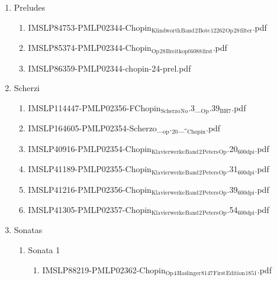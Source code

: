 \documentclass[11pt]{article}
\begin{document}
\begin{enumerate}
\item Preludes
\label{sec-1-1-1-1-44-21-6}
\begin{enumerate}
\item IMSLP84753-PMLP02344-Chopin$_{\text{Klindworth}}$$_{\text{Band}}$$_{\text{2}}$$_{\text{Bote}}$$_{\text{12262}}$$_{\text{Op}}$$_{\text{28}}$$_{\text{filter}}$.pdf
\label{sec-1-1-1-1-44-21-6-1}

\item IMSLP85374-PMLP02344-Chopin$_{\text{Op}}$$_{\text{28}}$$_{\text{Breitkopf}}$$_{\text{6088}}$$_{\text{first}}$.pdf
\label{sec-1-1-1-1-44-21-6-2}

\item IMSLP86359-PMLP02344-chopin-24-prel.pdf
\label{sec-1-1-1-1-44-21-6-3}
\end{enumerate}

\item Scherzi
\label{sec-1-1-1-1-44-21-7}
\begin{enumerate}
\item IMSLP114447-PMLP02356-FChopin$_{\text{Scherzo}}$$_{\text{No}}$.3\_$_{\text{Op}}$.39$_{\text{BH7}}$.pdf
\label{sec-1-1-1-1-44-21-7-1}

\item IMSLP164605-PMLP02354-Scherzo\_$_{\text{op}}$.$_{\text{20}}$\_-$_{\text{Chopin}}$.pdf
\label{sec-1-1-1-1-44-21-7-2}

\item IMSLP40916-PMLP02354-Chopin$_{\text{Klavierwerke}}$$_{\text{Band}}$$_{\text{2}}$$_{\text{Peters}}$$_{\text{Op}}$.20$_{\text{600dpi}}$.pdf
\label{sec-1-1-1-1-44-21-7-3}

\item IMSLP41189-PMLP02355-Chopin$_{\text{Klavierwerke}}$$_{\text{Band}}$$_{\text{2}}$$_{\text{Peters}}$$_{\text{Op}}$.31$_{\text{600dpi}}$.pdf
\label{sec-1-1-1-1-44-21-7-4}

\item IMSLP41216-PMLP02356-Chopin$_{\text{Klavierwerke}}$$_{\text{Band}}$$_{\text{2}}$$_{\text{Peters}}$$_{\text{Op}}$.39$_{\text{600dpi}}$.pdf
\label{sec-1-1-1-1-44-21-7-5}

\item IMSLP41305-PMLP02357-Chopin$_{\text{Klavierwerke}}$$_{\text{Band}}$$_{\text{2}}$$_{\text{Peters}}$$_{\text{Op}}$.54$_{\text{600dpi}}$.pdf
\label{sec-1-1-1-1-44-21-7-6}
\end{enumerate}

\item Sonatas
\label{sec-1-1-1-1-44-21-8}
\begin{enumerate}
\item Sonata 1
\label{sec-1-1-1-1-44-21-8-1}
\begin{enumerate}
\item IMSLP88219-PMLP02362-Chopin$_{\text{Op}}$$_{\text{4}}$$_{\text{Haslinger}}$$_{\text{8147}}$$_{\text{First}}$$_{\text{Edition}}$$_{\text{1851}}$.pdf
\label{sec-1-1-1-1-44-21-8-1-1}
\end{enumerate}


\end{enumerate}
\end{enumerate}
\end{document}
